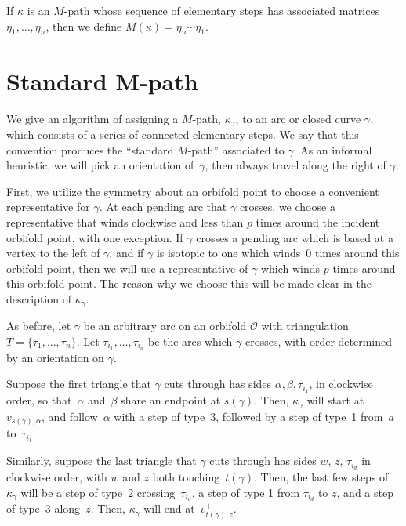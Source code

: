 \documentclass[pdftex]{sigma}%
\numberwithin{equation}{section}
\begin{document}
\begin{Definition}If $\kappa$ is an $M$-path whose sequence of elementary steps has associated matrices $\eta_1,\ldots, \eta_n$, then we define $M(\kappa) = \eta_n \cdots \eta_1$.
\end{Definition}

\section[Standard $M$-path]{Standard $\boldsymbol{M}$-path}\label{sec:StandardMPath}

We give an algorithm of assigning a $M$-path, $\kappa_\gamma$, to an arc or closed curve $\gamma$, which consists of a series of connected elementary steps. We say that this convention produces the ``standard $M$-path'' associated to $\gamma$. As an informal heuristic, we will pick an orientation of~$\gamma$, then always travel along the right of $\gamma$.

First, we utilize the symmetry about an orbifold point to choose a convenient representative for $\gamma$. At each pending arc that $\gamma$ crosses, we choose a representative that winds clockwise and less than $p$ times around the incident orbifold point, with one exception. If $\gamma$ crosses a pending arc which is based at a vertex to the left of $\gamma$, and if $\gamma$ is isotopic to one which winds~0 times around this orbifold point, then we will use a representative of $\gamma$ which winds $p$ times around this orbifold point. The reason why we choose this will be made clear in the description of $\kappa_\gamma$.

As before, let $\gamma$ be an arbitrary arc on an orbifold $\mathcal{O}$ with triangulation $T = \{\tau_1,\ldots, \tau_n\}$. Let $\tau_{i_1},\ldots, \tau_{i_d}$ be the arcs which $\gamma$ crosses, with order determined by an orientation on $\gamma$.

Suppose the first triangle that $\gamma$ cuts through has sides $\alpha,\beta,\tau_{i_1}$, in clockwise order, so that~$\alpha$ and~$\beta$ share an endpoint at $s(\gamma)$. Then, $\kappa_\gamma$ will start at $v_{s(\gamma),\alpha}^-$, and follow~$\alpha$ with a step of type~3, followed by a step of type~1 from~$a$ to~$\tau_{i_1}$.

Similarly, suppose the last triangle that $\gamma$ cuts through has sides $w$, $z$, $\tau_{i_d}$ in clockwise order, with $w$ and $z$ both touching~$t(\gamma)$. Then, the last few steps of $\kappa_\gamma$ will be a step of type~2 crossing~$\tau_{i_d}$, a step of type 1 from $\tau_{i_d}$ to $z$, and a step of type~3 along~$z$. Then, $\kappa_\gamma$ will end at~$v^+_{t(\gamma),z}$.
\end{document}
